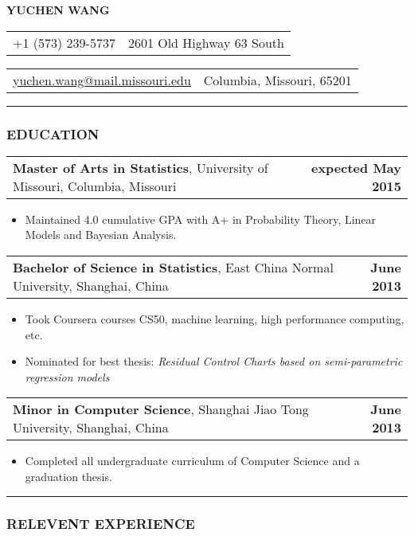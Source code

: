 \documentclass[11pt]{article}
\makeatletter
\newcommand{\headerrow}[2]
{\begin{tabular*}{\linewidth}{l@{\extracolsep{\fill}}r}
	#1 & #2 \\
\end{tabular*}
}
\makeatother
\begin{document}
\begin{center}
	\huge\textbf{YUCHEN WANG}
\end{center}

\noindent\headerrow{+1 (573) 239-5737}{2601 Old Highway 63 South}
\headerrow
{\href{mailto:yuchen.wang@mail.missouri.edu}{yuchen.wang@mail.missouri.edu}}
{Columbia, Missouri, 65201}

\vspace{-.8em}
\hrule

\subsubsection*{\centering EDUCATION}
\vspace{-.3em}

\headerrow
	{\textbf{Master of Arts in Statistics}, University of Missouri, Columbia, Missouri}
	{\textbf{expected May 2015}}
	\begin{itemize}
		\item Maintained 4.0 cumulative GPA with A+ in Probability Theory, Linear Models and Bayesian Analysis.
	\end{itemize}

\noindent\headerrow
	{\textbf{Bachelor of Science in Statistics}, East China Normal University, Shanghai, China}
	{\textbf{June 2013}}
	\begin{itemize}
		\item Took Coursera courses CS50, machine learning, high performance computing, etc.
		\item Nominated for best thesis: \textit{Residual Control Charts based on semi-parametric regression models}
	\end{itemize}

\noindent\headerrow
	{\textbf{Minor in Computer Science}, Shanghai Jiao Tong University, Shanghai, China}
	{\textbf{June 2013}}
	\begin{itemize}
		\item Completed all undergraduate curriculum of Computer Science and a graduation thesis.
	\end{itemize}


\vspace{0.2em}
\hrule


\subsubsection*{\centering RELEVENT EXPERIENCE}
\vspace{-.3em}
\end{document}
